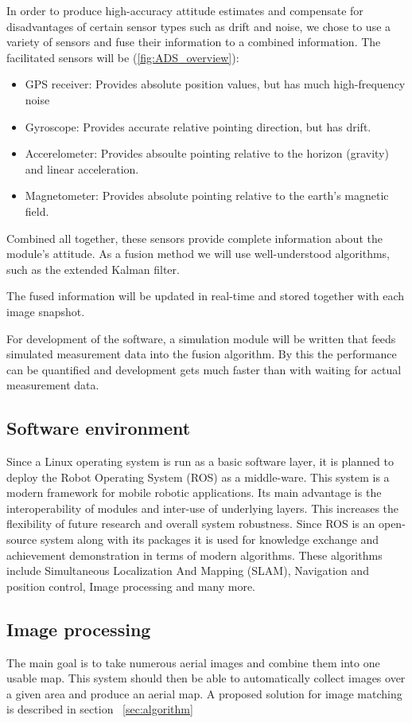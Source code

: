 \documentclass[fontsize=11pt,paper=a4,]{scrartcl}
\begin{document}
In order to produce high-accuracy attitude estimates and compensate for disadvantages of certain sensor types such as drift and noise, we chose to use a variety of sensors and fuse their information to a combined information.
The facilitated sensors will be (\ref{fig:ADS_overview}):
\begin{itemize}
\item GPS receiver: Provides absolute position values, but has much high-frequency noise
\item Gyroscope: Provides accurate relative pointing direction, but has drift.
\item Accerelometer: Provides absoulte pointing relative to the horizon (gravity) and linear acceleration.
\item Magnetometer: Provides absolute pointing relative to the earth's magnetic field.
\end{itemize}

Combined all together, these sensors provide complete information about the module's attitude.
As a fusion method we will use well-understood algorithms, such as the extended Kalman filter.

The fused information will be updated in real-time and stored together with each image snapshot.

For development of the software, a simulation module will be written that feeds simulated measurement data into the fusion algorithm.
By this the performance can be quantified and development gets much faster than with waiting for actual measurement data. 


\FloatBarrier
\subsection{Software environment}
Since a Linux operating system is run as a basic software layer, it is planned to deploy the Robot Operating System (ROS) as a middle-ware. This system is a modern framework
for mobile robotic applications. Its main advantage is the interoperability of modules and inter-use of underlying 
layers. This increases the flexibility of future research and overall system robustness. Since ROS is an open-source system along with its packages it is used for knowledge exchange and achievement demonstration in terms of modern algorithms. These algorithms include Simultaneous Localization
And Mapping (SLAM), Navigation and position control, Image processing and many more.  

\subsection{Image processing}
The main goal is to take numerous aerial images and combine them into one usable map. This system should then be able
to automatically collect images over a given area and produce an aerial map. A proposed solution
for image matching is described in section ~\ref{sec:algorithm}
\end{document}
